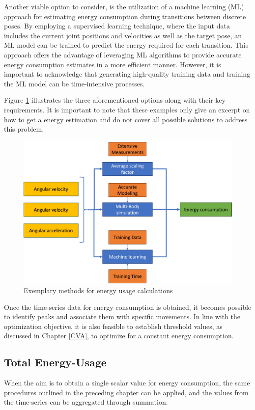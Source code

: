 Another viable option to consider, is the utilization of a machine learning (ML) approach for estimating energy consumption during transitions between discrete poses. By employing a supervised learning technique, where the input data includes the current joint positions and velocities as well as the target pose, an ML model can be trained to predict the energy required for each transition. This approach offers the advantage of leveraging ML algorithms to provide accurate energy consumption estimates in a more efficient manner. However, it is important to acknowledge that generating high-quality training data and training the ML model can be time-intensive processes.

Figure \ref{ENERGYOPTIONS} illustrates the three aforementioned options along with their key requirements. It is important to note that these examples only give an excerpt on how to get a energy estimation and do not cover all possible solutions to address this problem. 

\begin{figure}[H]
	\centerline{\includegraphics[width=.9\textwidth]{figures/ENERGYOPTIONS.png}}
	\caption{Exemplary methods for energy usage calculations}
	\label{ENERGYOPTIONS}
\end{figure}

Once the time-series data for energy consumption is obtained, it becomes possible to identify peaks and associate them with specific movements. In line with the optimization objective, it is also feasible to establish threshold values, as discussed in Chapter \ref{CVA}, to optimize for a constant energy consumption.


\subsection{Total Energy-Usage}
When the aim is to obtain a single scalar value for energy consumption, the same procedures outlined in the preceding chapter can be applied, and the values from the time-series can be aggregated through summation.

